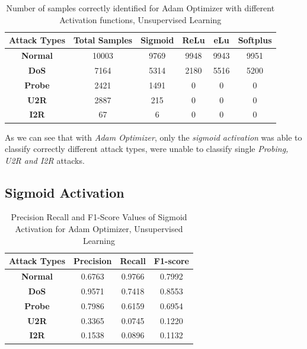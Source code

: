 \documentclass[12pt, a4paper]{report}
\begin{document}
\begin{appendices}
 
	\begin{table}[h]
	\centering
	\captionsetup{justification=centering,margin=2cm}
	\begin{tabular}{|c|c|c|c|c|c|}
	\hline
	\textbf{Attack Types} & \textbf{Total Samples} & \textbf{Sigmoid} & \textbf{ReLu} & \textbf{eLu} & \textbf{Softplus} \\ \hline
	\textbf{Normal}       & 10003                  & 9769            & 9948         & 9943        & 9951           \\ \hline
	\textbf{DoS}          & 7164                  & 5314            & 2180         & 5516        & 5200             \\ \hline
	\textbf{Probe}        & 2421                  & 1491             & 0          & 0         & 0              \\ \hline
	\textbf{U2R}          & 2887                    & 215             & 0           & 0          & 0               \\ \hline
	\textbf{I2R}          & 67                     & 6               & 0            & 0           & 0                \\ \hline
	\end{tabular}
	\caption{Number of samples correctly identified for Adam Optimizer with different Activation functions, Unsupervised Learning}
	\label{confusion_adam_tf}
	\end{table}
  
  As we can see that with \textit{Adam Optimizer}, only the \textit{sigmoid activation} was able to classify correctly different attack types, were unable to classify single \textit{Probing, U2R and I2R} attacks.
   \subsection{Sigmoid Activation}
 	 \begin{table}[ht]
		\centering
		\captionsetup{justification=centering,margin=2cm}
		\begin{tabular}{|c|c|c|c|}
		\hline
		\textbf{Attack Types} & \textbf{Precision} & \textbf{Recall} & \textbf{F1-score} \\ \hline
		\textbf{Normal}       & 0.6763             & 0.9766          & 0.7992            \\ \hline
		\textbf{DoS}          & 0.9571             & 0.7418          & 0.8553            \\ \hline
		\textbf{Probe}        & 0.7986             & 0.6159          & 0.6954            \\ \hline
		\textbf{U2R}          & 0.3365             & 0.0745          & 0.1220            \\ \hline
		\textbf{I2R}          & 0.1538             & 0.0896          & 0.1132            \\ \hline
		\end{tabular}
		\caption{Precision Recall and F1-Score Values of Sigmoid Activation for Adam Optimizer, Unsupervised Learning}
		\label{classification sigmoid adam tf}
		\end{table} 
  

\end{appendices}
\end{document}
